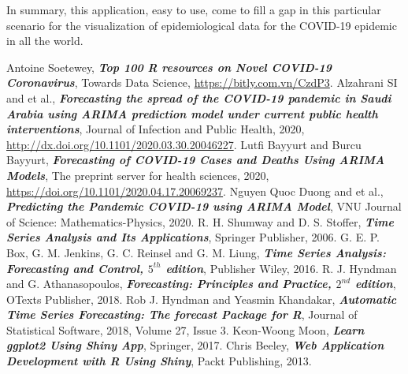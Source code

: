 \documentclass[12pt, a4paper,oneside]{book}
\theoremstyle{definition}
\begin{document}
In summary, this application, easy to use, come to fill a gap in this particular scenario for the visualization of epidemiological data for the COVID-19  epidemic in all the world.
\clearpage
\begin{thebibliography}{99}
	 Antoine Soetewey, \textbf{\textit{Top 100 R resources on Novel COVID-19 Coronavirus}}, Towards Data Science, \url{https://bitly.com.vn/CzdP3}.
	 Alzahrani SI and et al., \textbf{\textit{Forecasting the spread of the COVID-19 pandemic in Saudi Arabia using ARIMA prediction model under current public health interventions}}, Journal of Infection and Public Health, 2020, \url{http://dx.doi.org/10.1101/2020.03.30.20046227}.
	 Lutfi Bayyurt and Burcu Bayyurt, \textbf{\textit{Forecasting of COVID-19 Cases and Deaths Using ARIMA Models}}, The preprint server for health sciences, 2020, \url{https://doi.org/10.1101/2020.04.17.20069237}.
	 Nguyen Quoc Duong and et al., \textbf{\textit{Predicting the Pandemic COVID-19 using ARIMA Model}}, VNU Journal of Science: Mathematics-Physics, 2020.
	 R. H. Shumway and D. S. Stoffer, \textbf{\textit{Time Series Analysis and Its Applications}}, Springer Publisher, 2006.
     G. E. P. Box, G. M. Jenkins, G. C. Reinsel and G. M. Liung, \textbf{\textit{Time Series Analysis: Forecasting and Control, $5^{th}$ edition}}, Publisher Wiley, 2016.
     R. J. Hyndman and G. Athanasopoulos, \textbf{\textit{Forecasting: Principles and Practice, $2^{nd}$ edition}}, OTexts Publisher, 2018.
     Rob J. Hyndman and Yeasmin Khandakar, \textbf{\textit{Automatic Time Series Forecasting: The forecast Package for R}}, Journal of Statistical Software, 2018, Volume 27, Issue 3.
     Keon-Woong Moon, \textbf{\textit{Learn ggplot2 Using Shiny App}}, Springer, 2017.
     Chris Beeley, \textbf{\textit{Web Application Development with R Using Shiny}}, Packt Publishing, 2013.
\end{thebibliography}
\end{document}
